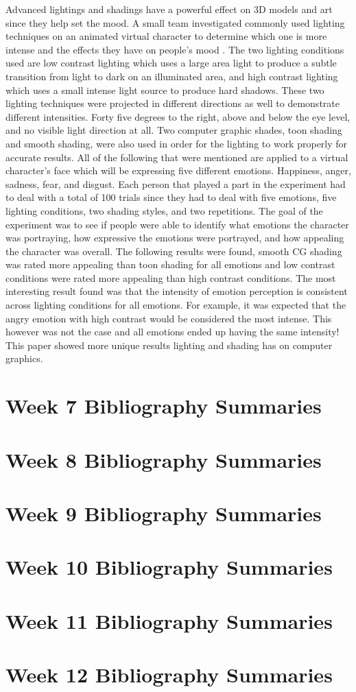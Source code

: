 \documentclass{article}
\begin{document}
Advanced lightings and shadings have a powerful effect on 3D models and art since they help set the mood. A small team investigated commonly used lighting techniques on an animated virtual character to determine which one is more intense and the effects they have on people's mood \cite{10.1145/2931002.2931015}. The two lighting conditions used are low contrast lighting which uses a large area light to produce a subtle transition from light to dark on an illuminated area, and high contrast lighting which uses a small intense light source to produce hard shadows. These two lighting techniques were projected in different directions as well to demonstrate different intensities. Forty five degrees to the right, above and below the eye level, and no visible light direction at all. Two computer graphic shades, toon shading and smooth shading, were also used in order for the lighting to work properly for accurate results. All of the following that were mentioned are applied to a virtual character’s face which will be expressing five different emotions. Happiness, anger, sadness, fear, and disgust. Each person that played a part in the experiment had to deal with a total of 100 trials since they had to deal with five emotions, five lighting conditions, two shading styles, and two repetitions. The goal of the experiment was to see if people were able to identify what emotions the character was portraying, how expressive the emotions were portrayed, and how appealing the character was overall. The following results were found, smooth CG shading was rated more appealing than toon shading for all emotions and low contrast conditions were rated more appealing than high contrast conditions. The most interesting result found was that the intensity of emotion perception is consistent across lighting conditions for all emotions. For example, it was expected that the angry emotion with high contrast would be considered the most intense. This however was not the case and all emotions ended up having the same intensity! This paper showed more unique results lighting and shading has on computer graphics.

\section{Week 7 Bibliography Summaries}

\section{Week 8 Bibliography Summaries}

\section{Week 9 Bibliography Summaries}

\section{Week 10 Bibliography Summaries}

\section{Week 11 Bibliography Summaries}

\section{Week 12 Bibliography Summaries}




\end{document}
